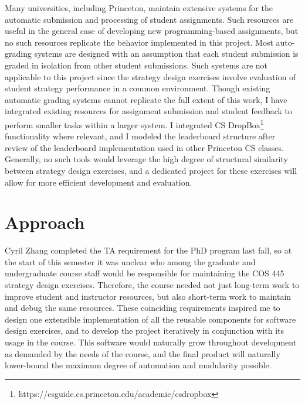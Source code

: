 \documentclass[pageno]{jpaper}
\begin{document}
Many universities, including Princeton, maintain extensive systems for the automatic submission and processing of student assignments.
Such resources are useful in the general case of developing new programming-based assignments, but no such resources replicate the behavior implemented in this project.
Most auto-grading systems are designed with an assumption that each student submission is graded in isolation from other student submissions.
Such systems are not applicable to this project since the strategy design exercises involve evaluation of student strategy performance in a common environment.
Though existing automatic grading systems cannot replicate the full extent of this work, I have integrated existing resources for assignment submission and student feedback to perform smaller tasks within a larger system.
I integrated CS DropBox\footnote{https://csguide.cs.princeton.edu/academic/csdropbox} functionality where relevant, and I modeled the leaderboard structure after review of the leaderboard implementation used in other Princeton CS classes.
Generally, no such tools would leverage the high degree of structural similarity between strategy design exercises, and a dedicated project for these exercises will allow for more efficient development and evaluation.

\section*{Approach}
Cyril Zhang completed the TA requirement for the PhD program last fall, so at the start of this semester it was unclear who among the graduate and undergraduate course staff would be responsible for maintaining the COS 445 strategy design exercises.
Therefore, the course needed not just long-term work to improve student and instructor resources, but also short-term work to maintain and debug the same resources.
These coinciding requirements inspired me to design one extensible implementation of all the reusable components for software design exercises, and to develop the project iteratively in conjunction with its usage in the course.
This software would naturally grow throughout development as demanded by the needs of the course, and the final product will naturally lower-bound the maximum degree of automation and modularity possible.
\end{document}
